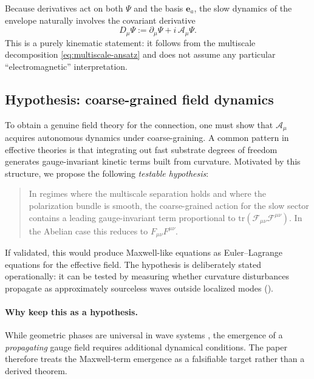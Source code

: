 Because derivatives act on both $\Psi$ and the basis $\mathbf{e}_a$, the slow dynamics of the envelope naturally
involves the covariant derivative
\begin{equation}
  D_\mu \Psi := \partial_\mu \Psi + i\,\mathcal{A}_\mu \Psi.
  \label{eq:covariant-derivative}
\end{equation}
This is a purely kinematic statement: it follows from the multiscale decomposition \eqref{eq:multiscale-ansatz}
and does not assume any particular ``electromagnetic'' interpretation.

\subsection{Hypothesis: coarse-grained field dynamics}

To obtain a genuine field theory for the connection, one must show that $\mathcal{A}_\mu$ acquires autonomous
dynamics under coarse-graining. A common pattern in effective theories is that integrating out fast substrate degrees
of freedom generates gauge-invariant kinetic terms built from curvature.
Motivated by this structure, we propose the following \emph{testable hypothesis}:

\begin{quote}
In regimes where the multiscale separation holds and where the polarization bundle is smooth,
the coarse-grained action for the slow sector contains a leading gauge-invariant term
proportional to $\mathrm{tr}(\mathcal{F}_{\mu\nu}\mathcal{F}^{\mu\nu})$.
In the Abelian case this reduces to $F_{\mu\nu}F^{\mu\nu}$.
\end{quote}

If validated, this would produce Maxwell-like equations as Euler--Lagrange equations for the effective field.
The hypothesis is deliberately stated operationally: it can be tested by measuring whether curvature disturbances
propagate as approximately sourceless waves outside localized modes ().

\paragraph{Why keep this as a hypothesis.}
While geometric phases are universal in wave systems \citep{Pancharatnam1956,Berry1984,Bliokh2015SpinOrbit,Cisowski2022},
the emergence of a \emph{propagating} gauge field requires additional dynamical conditions.
The paper therefore treats the Maxwell-term emergence as a falsifiable target rather than a derived theorem.

